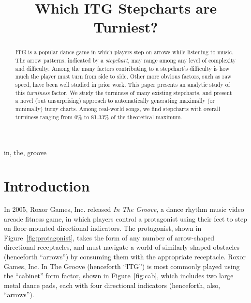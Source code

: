 \documentclass[10pt]{sigplanconf}
\begin{document}
\copyrightdata{}


\title{
Which ITG Stepcharts are Turniest?
}


\maketitle

\begin{abstract}
	ITG is a popular dance game in which players step on arrows while listening to music. The arrow patterns, indicated by a {\em stepchart}, may range among any level of complexity and difficulty. Among the many factors contributing to a stepchart's difficulty is how much the player must turn from side to side.
	Other more obvious factors, such as raw speed, have been well studied in prior work.
	This paper presents an analytic study of this {\em turniness} factor.
	We study the turniness of many existing stepcharts, and present a novel (but unsurprising) approach to automatically generating maximally (or minimally) turny charts.
	Among real-world songs, we find stepcharts with overall turniness ranging from 0\% to 81.33\% of the theoretical maximum.


\end{abstract}


\keywords
in, the, groove


\section{Introduction}

In 2005, Roxor Games, Inc. released {\em In The Groove}, a dance rhythm music video arcade fitness game, in which players control a protagonist using their feet to step on floor-mounted directional indicators. The protagonist, shown in Figure~\ref{fig:protagonist}, takes the form of any number of arrow-shaped directional receptacles, and must navigate a world of similarly-shaped obstacles (henceforth ``arrows'') by consuming them with the appropriate receptacle.
Roxor Games, Inc. In The Groove (henceforth ``ITG'') is most commonly played using the ``cabinet'' form factor, shown in Figure~\ref{fig:cab}, which includes two large metal dance pads, each with four directional indicators (henceforth, also, ``arrows'').
\end{document}
